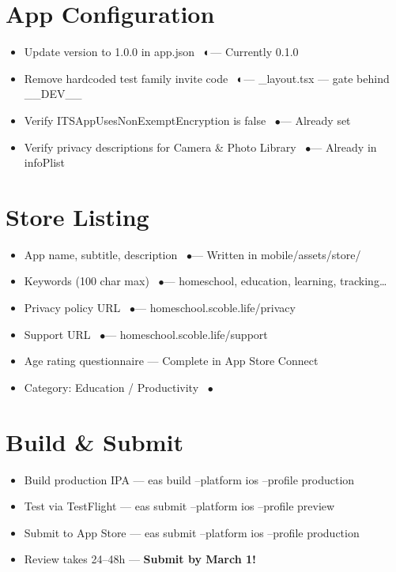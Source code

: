 \documentclass[9pt,letterpaper]{article}
\newcommand{\done}{~\hfill$\bullet$}
\newcommand{\warn}{~\hfill$\LEFTcircle$}
\newcommand{\dt}[1]{{\footnotesize\color{lg}--- #1}}
\begin{document}
\section*{App Configuration}
\begin{itemize}[leftmargin=1.5em, label=$\square$, itemsep=1pt, parsep=0pt, topsep=2pt]
  \item Update version to 1.0.0 in app.json \warn \dt{Currently 0.1.0}
  \item Remove hardcoded test family invite code \warn \dt{\_layout.tsx --- gate behind \_\_DEV\_\_}
  \item Verify ITSAppUsesNonExemptEncryption is false \done \dt{Already set}
  \item Verify privacy descriptions for Camera \& Photo Library \done \dt{Already in infoPlist}
\end{itemize}

\section*{Store Listing}
\begin{itemize}[leftmargin=1.5em, label=$\square$, itemsep=1pt, parsep=0pt, topsep=2pt]
  \item App name, subtitle, description \done \dt{Written in mobile/assets/store/}
  \item Keywords (100 char max) \done \dt{homeschool, education, learning, tracking\ldots}
  \item Privacy policy URL \done \dt{homeschool.scoble.life/privacy}
  \item Support URL \done \dt{homeschool.scoble.life/support}
  \item Age rating questionnaire \dt{Complete in App Store Connect}
  \item Category: Education / Productivity \done
\end{itemize}

\section*{Build \& Submit}
\begin{itemize}[leftmargin=1.5em, label=$\square$, itemsep=1pt, parsep=0pt, topsep=2pt]
  \item Build production IPA \dt{eas build --platform ios --profile production}
  \item Test via TestFlight \dt{eas submit --platform ios --profile preview}
  \item Submit to App Store \dt{eas submit --platform ios --profile production}
  \item Review takes 24--48h \dt{\textbf{Submit by March 1!}}
\end{itemize}
\end{document}
